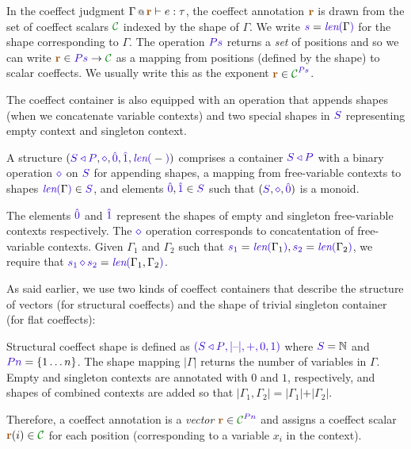 In the coeffect judgment $\coctx{\Gamma}{\aclrd{\textbf{r}}} \vdash e : \tau$, the coeffect annotation
$\aclrd{\textbf{r}}$ is drawn from the set of coeffect scalars $\C$ indexed by the shape of $\Gamma$.
We write $\sclrd{s} = \slen{\Gamma}$ for the shape corresponding to $\Gamma$. The operation $\SP\sclrd{s}$
returns a \emph{set} of positions and so we can write $\aclrd{\textbf{r}} \in \SP\sclrd{s} \rightarrow \C$ 
as a mapping from positions (defined by the shape) to scalar coeffects. We usually write this as 
the exponent $\aclrd{\textbf{r}} \in \C^{\SP\sclrd{s}}$.

The coeffect container is also equipped with an operation that appends shapes (when we concatenate
variable contexts) and two special shapes in $\SH$ representing empty context and singleton context. 

\begin{definition}
A \emph{} structure $(\SHP, \stimes, \sempty, \sunit, \slen{-})$ 
comprises a container $\SHP$ with a binary operation $\stimes$ on $\SH$ for appending shapes, a 
mapping from free-variable contexts to shapes $\slen{\Gamma} \in \SH$, and elements $\sempty,\sunit \in
\SH$ such that $(\SH, \stimes, \sempty)$ is a monoid.

The elements $\sempty$ and $\sunit$ represent the shapes of empty and singleton free-variable contexts 
respectively. The $\stimes$ operation corresponds to concatentation of free-variable contexts. Given
$\Gamma_1$ and $\Gamma_2$ such that $\sclrd{s_1}=\slen{\Gamma_1}, \sclrd{s_2}=\slen{\Gamma_2}$, 
we require that $\sclrd{s_1}\,\stimes\,\sclrd{s_2}=\slen{\Gamma_1, \Gamma_2}$. 
\end{definition}

\noindent
As said earlier, we use two kinds of coeffect containers that describe the structure of vectors 
(for structural coeffects) and the shape of trivial singleton container (for flat coeffects): 

\begin{example}
Structural coeffect shape is defined as $\sclrd{(\SHP, {|}\textnormal{--}{|}, +, 0, 1)}$
where $\SH=\mathbb{N}$ and $\SP \sclrd{n}=\{ 1 \ldots n \}$. The shape mapping ${|}\Gamma{|}$ returns the 
number of variables in $\Gamma$. Empty and singleton contexts are annotated with $0$ and $1$, 
respectively, and shapes of combined contexts are added so that ${|}\Gamma_1, \Gamma_2{|} = 
{|}\Gamma_1{|} + {|}\Gamma_2{|}$. 

Therefore, a coeffect annotation is a \emph{vector} 
$\aclrd{\textbf{r}} \in \C^{\SP\sclrd{n}}$ and assigns a coeffect scalar $\aclrd{\textbf{r}}(i) \in \C$ 
for each position (corresponding to a variable $x_i$ in the context).
\end{example}

